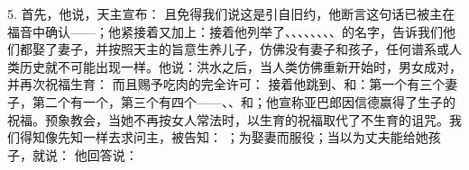 5. 首先，他说，天主宣布： 且免得我们说这是引自旧约，他断言这句话已被主在福音中确认——；他紧接着又加上：接着他列举了、、、、、、、、的名字，告诉我们他们都娶了妻子，并按照天主的旨意生养儿子，仿佛没有妻子和孩子，任何谱系或人类历史就不可能出现一样。他说：洪水之后，当人类仿佛重新开始时，男女成对，并再次祝福生育： 而且赐予吃肉的完全许可： 接着他跳到、和：第一个有三个妻子，第二个有一个，第三个有四个——、、和；他宣称亚巴郎因信德赢得了生子的祝福。预象教会，当她不再按女人常法时，以生育的祝福取代了不生育的诅咒。我们得知像先知一样去求问主，被告知： ；为娶妻而服役；当以为丈夫能给她孩子，就说： 他回答说： 